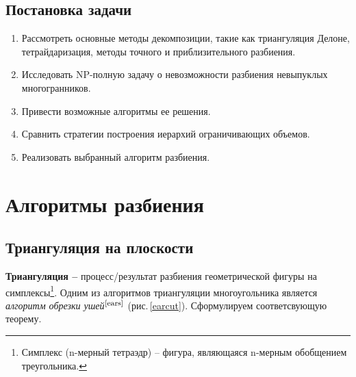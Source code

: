 \documentclass[11pt,a4paper]{extarticle}
\begin{document}
		\subsection{Постановка задачи}
			\begin{enumerate}
				\setlength\partopsep{0pt}
				\setlength\parskip{0pt}
				\setlength\parsep{0pt}
				\setlength\topsep{0pt}
				\setlength\itemsep{0pt}
				\item Рассмотреть основные методы декомпозиции, такие как триангуляция Делоне, тетрайдаризация, методы точного и приблизительного разбиения.
				\item Исследовать NP-полную задачу о невозможности разбиения невыпуклых многогранников.
				\item Привести возможные алгоритмы ее решения.
				\item Сравнить стратегии построения иерархий ограничивающих объемов.
				\item Реализовать выбранный алгоритм разбиения.
			\end{enumerate}
	
	\section{Алгоритмы разбиения}
		
		\subsection{Триангуляция на плоскости}
			\textbf{Триангуляция --} процесс/результат разбиения геометрической фигуры на симплексы\footnote{Симплекс (n-мерный тетраэдр) -- фигура, являющаяся n-мерным обобщением треугольника.}.
			Одним из алгоритмов триангуляции многоугольника является \emph{алгоритм обрезки ушей$^{\footnotesize{\ref{ears}}}$} (рис.\,\ref{earcut}). 
			Сформулируем соответсвующую теорему.
			
\end{document}
